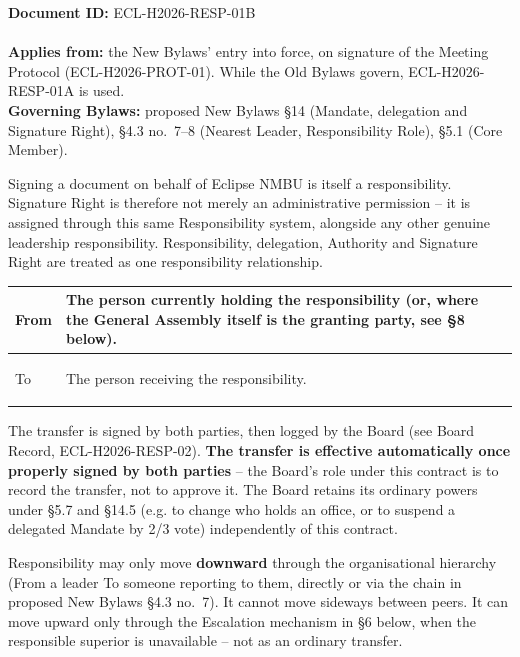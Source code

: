 \documentclass{../../../Common/Latex/Templates/rapport}
\date{\meetingdate, \meetingtime}
\begin{document}
\makecoverpage
\tableofcontents
\reportmainmatter

\noindent\textbf{Document ID:} ECL-H2026-RESP-01B\\
\meetingline\\
\textbf{Applies from:} the New Bylaws' entry into force, on signature of the Meeting Protocol (ECL-H2026-PROT-01). While the Old Bylaws govern, ECL-H2026-RESP-01A is used.\\
\textbf{Governing Bylaws:} proposed New Bylaws \S14 (Mandate, delegation and Signature Right), \S4.3 no.\ 7--8 (Nearest Leader, Responsibility Role), \S5.1 (Core Member).

Signing a document on behalf of Eclipse NMBU is itself a responsibility. Signature Right is therefore not merely an administrative permission -- it is assigned through this same Responsibility system, alongside any other genuine leadership responsibility. Responsibility, delegation, Authority and Signature Right are treated as one responsibility relationship.

\begin{tabularx}{\textwidth}{|>{\bfseries\raggedright\arraybackslash}p{3cm}|X|}
  \hline
  From & \rule{0pt}{1cm}The person currently holding the responsibility (or, where the General Assembly itself is the granting party, see \S8 below). \\
  \hline
  To   & \rule{0pt}{1cm}The person receiving the responsibility.                                                                                      \\
  \hline
\end{tabularx}

The transfer is signed by both parties, then logged by the Board (see Board Record, ECL-H2026-RESP-02). \textbf{The transfer is effective automatically once properly signed by both parties} -- the Board's role under this contract is to record the transfer, not to approve it. The Board retains its ordinary powers under \S5.7 and \S14.5 (e.g. to change who holds an office, or to suspend a delegated Mandate by 2/3 vote) independently of this contract.

Responsibility may only move \textbf{downward} through the organisational hierarchy (From a leader To someone reporting to them, directly or via the chain in proposed New Bylaws \S4.3 no.\ 7). It cannot move sideways between peers. It can move upward only through the Escalation mechanism in \S6 below, when the responsible superior is unavailable -- not as an ordinary transfer.
\end{document}
